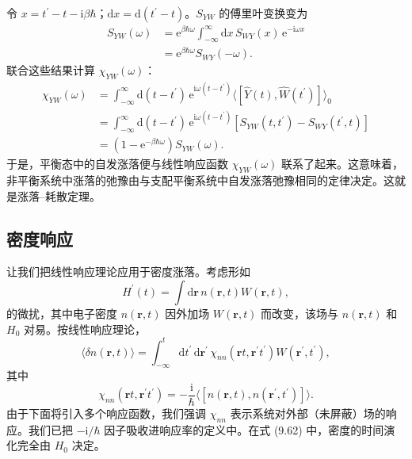 令 $x=t^{\prime}-t-\mathrm{i}\beta\hbar$；$\mathrm{d}x=\mathrm{d}(t^{\prime}-t)$。$S_{YW}$ 的傅里叶变换变为
\begin{equation*}
\begin{aligned}
S_{YW}(\omega)&=\mathrm{e}^{\beta\hbar\omega}\int_{-\infty}^{\infty}\mathrm{d}x\,S_{WY}(x)\,\mathrm{e}^{-\mathrm{i}\omega x}\\
&=\mathrm{e}^{\beta\hbar\omega}S_{WY}(-\omega).
\end{aligned}\tag{9.59}
\end{equation*}
联合这些结果计算 $\chi_{YW}(\omega)$：
\begin{equation*}
\begin{aligned}
\chi_{YW}(\omega)&=\int_{-\infty}^{\infty}\mathrm{d}(t-t^{\prime})\,\mathrm{e}^{\mathrm{i}\omega(t-t^{\prime})}\langle[\widehat{Y}(t),\widehat{W}(t^{\prime})]\rangle_0\\
&=\int_{-\infty}^{\infty}\mathrm{d}(t-t^{\prime})\,\mathrm{e}^{\mathrm{i}\omega(t-t^{\prime})}\left[S_{YW}(t,t^{\prime})-S_{WY}(t^{\prime},t)\right]\\
&=\left(1-\mathrm{e}^{-\beta\hbar\omega}\right)S_{YW}(\omega).
\end{aligned}\tag{9.60}
\end{equation*}
于是，平衡态中的自发涨落便与线性响应函数 $\chi_{YW}(\omega)$ 联系了起来。这意味着，非平衡系统中涨落的弛豫由与支配平衡系统中自发涨落弛豫相同的定律决定。这就是涨落–耗散定理。

\subsection{密度响应}

让我们把线性响应理论应用于密度涨落。考虑形如
\begin{equation*}
H^{\prime}(t)=\int\mathrm{d}\mathbf{r}\,n(\mathbf{r},t)W(\mathbf{r},t),\tag{9.61}
\end{equation*}
的微扰，其中电子密度 $n(\mathbf{r},t)$ 因外加场 $W(\mathbf{r},t)$ 而改变，该场与 $n(\mathbf{r},t)$ 和 $H_0$ 对易。按线性响应理论，
\begin{equation*}
\langle\delta n(\mathbf{r},t)\rangle=\int_{-\infty}^{t}\mathrm{d}t^{\prime}\,\mathrm{d}\mathbf{r}^{\prime}\,\chi_{nn}(\mathbf{r}t,\mathbf{r}^{\prime}t^{\prime})W(\mathbf{r}^{\prime},t^{\prime}),\tag{9.62}
\end{equation*}
其中
\begin{equation*}
\chi_{nn}(\mathbf{r}t,\mathbf{r}^{\prime}t^{\prime})=-\frac{\mathrm{i}}{\hbar}\langle[n(\mathbf{r},t),n(\mathbf{r}^{\prime},t^{\prime})]\rangle.\tag{9.63}
\end{equation*}
由于下面将引入多个响应函数，我们强调 $\chi_{nn}$ 表示系统对外部（未屏蔽）场的响应。我们已把 $-\mathrm{i}/\hbar$ 因子吸收进响应率的定义中。在式 (9.62) 中，密度的时间演化完全由 $H_0$ 决定。

